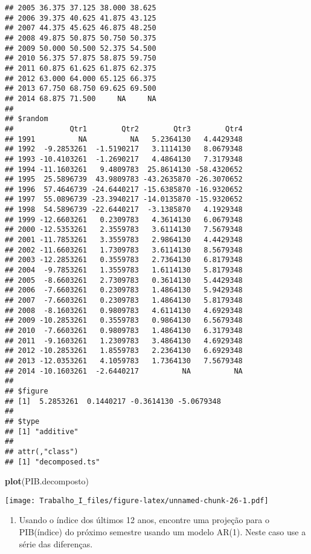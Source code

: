 \documentclass[]{article}
\newenvironment{Shaded}{\begin{snugshade}}{\end{snugshade}}
\newcommand{\KeywordTok}[1]{\textcolor[rgb]{0.13,0.29,0.53}{\textbf{#1}}}
\newcommand{\NormalTok}[1]{#1}
\providecommand{\tightlist}{%
  \setlength{\itemsep}{0pt}\setlength{\parskip}{0pt}}
\begin{document}
\begin{verbatim}
## 2005 36.375 37.125 38.000 38.625
## 2006 39.375 40.625 41.875 43.125
## 2007 44.375 45.625 46.875 48.250
## 2008 49.875 50.875 50.750 50.375
## 2009 50.000 50.500 52.375 54.500
## 2010 56.375 57.875 58.875 59.750
## 2011 60.875 61.625 61.875 62.375
## 2012 63.000 64.000 65.125 66.375
## 2013 67.750 68.750 69.625 69.500
## 2014 68.875 71.500     NA     NA
## 
## $random
##             Qtr1        Qtr2        Qtr3        Qtr4
## 1991          NA          NA   5.2364130   4.4429348
## 1992  -9.2853261  -1.5190217   3.1114130   8.0679348
## 1993 -10.4103261  -1.2690217   4.4864130   7.3179348
## 1994 -11.1603261   9.4809783  25.8614130 -58.4320652
## 1995  25.5896739  43.9809783 -43.2635870 -26.3070652
## 1996  57.4646739 -24.6440217 -15.6385870 -16.9320652
## 1997  55.0896739 -23.3940217 -14.0135870 -15.9320652
## 1998  54.5896739 -22.6440217  -3.1385870   4.1929348
## 1999 -12.6603261   0.2309783   4.3614130   6.0679348
## 2000 -12.5353261   2.3559783   3.6114130   7.5679348
## 2001 -11.7853261   3.3559783   2.9864130   4.4429348
## 2002 -11.6603261   1.7309783   3.6114130   8.5679348
## 2003 -12.2853261   0.3559783   2.7364130   6.8179348
## 2004  -9.7853261   1.3559783   1.6114130   5.8179348
## 2005  -8.6603261   2.7309783   0.3614130   5.4429348
## 2006  -7.6603261   0.2309783   1.4864130   5.9429348
## 2007  -7.6603261   0.2309783   1.4864130   5.8179348
## 2008  -8.1603261   0.9809783   4.6114130   4.6929348
## 2009 -10.2853261   0.3559783   0.9864130   6.5679348
## 2010  -7.6603261   0.9809783   1.4864130   6.3179348
## 2011  -9.1603261   1.2309783   3.4864130   4.6929348
## 2012 -10.2853261   1.8559783   2.2364130   6.6929348
## 2013 -12.0353261   4.1059783   1.7364130   7.5679348
## 2014 -10.1603261  -2.6440217          NA          NA
## 
## $figure
## [1]  5.2853261  0.1440217 -0.3614130 -5.0679348
## 
## $type
## [1] "additive"
## 
## attr(,"class")
## [1] "decomposed.ts"
\end{verbatim}

\begin{Shaded}
\begin{Highlighting}[]
\KeywordTok{plot}\NormalTok{(PIB.decomposto)}
\end{Highlighting}
\end{Shaded}

\texttt{[image: Trabalho\_I\_files/figure-latex/unnamed-chunk-26-1.pdf]}

\begin{enumerate}
\def\labelenumi{\alph{enumi})}
\setcounter{enumi}{2}
\tightlist
\item
  Usando o índice dos últimos 12 anos, encontre uma projeção para o
  PIB(índice) do próximo semestre usando um modelo AR(1). Neste caso use
  a série das diferenças.
\end{enumerate}
\end{document}
